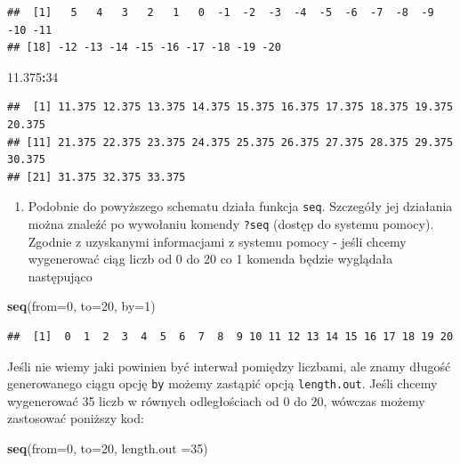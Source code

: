 \documentclass[]{book}
\newenvironment{Shaded}{\begin{snugshade}}{\end{snugshade}}
\newcommand{\KeywordTok}[1]{\textcolor[rgb]{0.13,0.29,0.53}{\textbf{#1}}}
\newcommand{\DataTypeTok}[1]{\textcolor[rgb]{0.13,0.29,0.53}{#1}}
\newcommand{\DecValTok}[1]{\textcolor[rgb]{0.00,0.00,0.81}{#1}}
\newcommand{\FloatTok}[1]{\textcolor[rgb]{0.00,0.00,0.81}{#1}}
\newcommand{\OperatorTok}[1]{\textcolor[rgb]{0.81,0.36,0.00}{\textbf{#1}}}
\newcommand{\NormalTok}[1]{#1}
\providecommand{\tightlist}{%
  \setlength{\itemsep}{0pt}\setlength{\parskip}{0pt}}
\theoremstyle{definition}
\theoremstyle{definition}
\theoremstyle{definition}
\theoremstyle{remark}
\begin{document}
\begin{verbatim}
##  [1]   5   4   3   2   1   0  -1  -2  -3  -4  -5  -6  -7  -8  -9 -10 -11
## [18] -12 -13 -14 -15 -16 -17 -18 -19 -20
\end{verbatim}

\begin{Shaded}
\begin{Highlighting}[]
\FloatTok{11.375}\OperatorTok{:}\DecValTok{34}
\end{Highlighting}
\end{Shaded}

\begin{verbatim}
##  [1] 11.375 12.375 13.375 14.375 15.375 16.375 17.375 18.375 19.375 20.375
## [11] 21.375 22.375 23.375 24.375 25.375 26.375 27.375 28.375 29.375 30.375
## [21] 31.375 32.375 33.375
\end{verbatim}

\begin{enumerate}
\def\labelenumi{\arabic{enumi}.}
\setcounter{enumi}{1}
\tightlist
\item
  Podobnie do powyższego schematu działa funkcja \texttt{seq}. Szczegóły
  jej działania można znaleźć po wywołaniu komendy \texttt{?seq} (dostęp
  do systemu pomocy). Zgodnie z uzyskanymi informacjami z systemu pomocy
  - jeśli chcemy wygenerować ciąg liczb od 0 do 20 co 1 komenda będzie
  wyglądała następująco
\end{enumerate}

\begin{Shaded}
\begin{Highlighting}[]
\KeywordTok{seq}\NormalTok{(}\DataTypeTok{from=}\DecValTok{0}\NormalTok{, }\DataTypeTok{to=}\DecValTok{20}\NormalTok{, }\DataTypeTok{by=}\DecValTok{1}\NormalTok{)}
\end{Highlighting}
\end{Shaded}

\begin{verbatim}
##  [1]  0  1  2  3  4  5  6  7  8  9 10 11 12 13 14 15 16 17 18 19 20
\end{verbatim}

Jeśli nie wiemy jaki powinien być interwał pomiędzy liczbami, ale znamy
długość generowanego ciągu opcję \texttt{by} możemy zastąpić opcją
\texttt{length.out}. Jeśli chcemy wygenerować 35 liczb w równych
odległościach od 0 do 20, wówczas możemy zastosować poniższy kod:

\begin{Shaded}
\begin{Highlighting}[]
\KeywordTok{seq}\NormalTok{(}\DataTypeTok{from=}\DecValTok{0}\NormalTok{, }\DataTypeTok{to=}\DecValTok{20}\NormalTok{, }\DataTypeTok{length.out =}\DecValTok{35}\NormalTok{)}
\end{Highlighting}
\end{Shaded}
\end{document}
